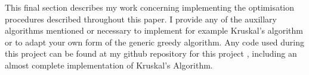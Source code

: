 \documentclass[../main.tex]{subfiles}
\begin{document}
This final section describes my work concerning implementing the optimisation procedures described throughout this paper. I provide any of the auxillary algorithms mentioned or necessary to implement for example Kruskal's algorithm or to adapt your own form of the generic greedy algorithm.  Any code used during this project can be found at my github repository for this project \cite{github}, including an almost complete implementation of Kruskal's Algorithm.
\end{document}

